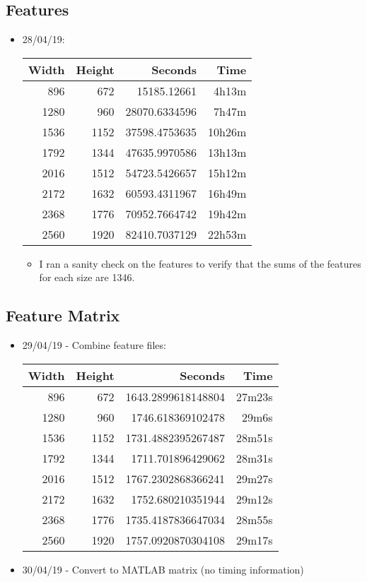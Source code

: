 \subsection{Features}
\begin{itemize}
\item 28/04/19:
  \begin{center}
  \begin{tabular}{ r r | r r }
  Width & Height & Seconds & Time \\ \hline
  896 & 672 & 15185.12661 & 4h13m \\
  1280 & 960 & 28070.6334596 & 7h47m \\
  1536 & 1152 & 37598.4753635 & 10h26m \\
  1792 & 1344 & 47635.9970586 & 13h13m \\
  2016 & 1512 & 54723.5426657 & 15h12m \\
  2172 & 1632 & 60593.4311967 & 16h49m \\
  2368 & 1776 & 70952.7664742 & 19h42m \\
  2560 & 1920 & 82410.7037129 & 22h53m \\
  \end{tabular}
  \end{center}
  \begin{itemize}
  \item I ran a sanity check on the features to verify that the sums of the features for each size are 1346.
  \end{itemize}
\end{itemize}

\subsection{Feature Matrix}
\begin{itemize}
\item 29/04/19 - Combine feature files:
    \begin{center}
    \begin{tabular}{ r r | r r }
    Width & Height & Seconds & Time \\ \hline
    896 & 672 & 1643.2899618148804 & 27m23s \\
    1280 & 960 & 1746.618369102478 & 29m6s \\
    1536 & 1152 & 1731.4882395267487 & 28m51s \\
    1792 & 1344 & 1711.701896429062 & 28m31s \\
    2016 & 1512 & 1767.2302868366241 & 29m27s \\
    2172 & 1632 & 1752.680210351944 & 29m12s \\
    2368 & 1776 & 1735.4187836647034 & 28m55s \\
    2560 & 1920 & 1757.0920870304108 & 29m17s \\
    \end{tabular}
    \end{center}
  \item 30/04/19 - Convert to MATLAB matrix (no timing information)
\end{itemize}